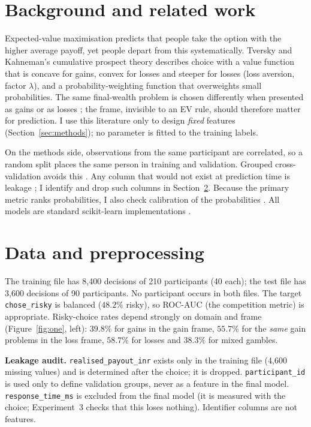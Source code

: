 \documentclass[11pt,a4paper]{article}
\begin{document}
\section{Background and related work}
Expected-value maximisation predicts that people take the option with the higher average payoff, yet people depart from this systematically. Tversky and Kahneman's cumulative prospect theory \cite{tk92} describes choice with a value function that is concave for gains, convex for losses and steeper for losses (loss aversion, factor $\lambda$), and a probability-weighting function that overweights small probabilities. The same final-wealth problem is chosen differently when presented as gains or as losses \cite{tk81}; the frame, invisible to an EV rule, should therefore matter for prediction. I use this literature only to design \emph{fixed} features (Section~\ref{sec:methods}); no parameter is fitted to the training labels.

On the methods side, observations from the same participant are correlated, so a random split places the same person in training and validation. Grouped cross-validation avoids this \cite{roberts17}. Any column that would not exist at prediction time is leakage \cite{kaufman12}; I identify and drop such columns in Section~\ref{sec:data}. Because the primary metric ranks probabilities, I also check calibration of the probabilities \cite{nm05}. All models are standard scikit-learn implementations \cite{sklearn}.

\section{Data and preprocessing}\label{sec:data}
The training file has 8{,}400 decisions of 210 participants (40 each); the test file has 3{,}600 decisions of 90 participants. No participant occurs in both files. The target \texttt{chose\_risky} is balanced ($48.2\%$ risky), so ROC-AUC (the competition metric) is appropriate. Risky-choice rates depend strongly on domain and frame (Figure~\ref{fig:one}, left): $39.8\%$ for gains in the gain frame, $55.7\%$ for the \emph{same} gain problems in the loss frame, $58.7\%$ for losses and $38.3\%$ for mixed gambles.

\textbf{Leakage audit.} \texttt{realised\_\allowbreak payout\_\allowbreak inr} exists only in the training file (4{,}600 missing values) and is determined after the choice; it is dropped. \texttt{participant\_id} is used only to define validation groups, never as a feature in the final model. \texttt{response\_\allowbreak time\_\allowbreak ms} is excluded from the final model (it is measured with the choice; Experiment~3 checks that this loses nothing). Identifier columns are not features.
\end{document}
